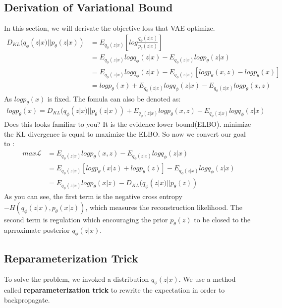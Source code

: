 \documentclass{article}
\begin{document}
\subsection{Derivation of Variational Bound}
In this section, we will derivate the objective loss that VAE optimize.
\begin{align*}
D_{KL}(q_{\phi}(z|x)||p_{\theta}(z|x)) &= E_{q_{\phi}(z|x)} \left[ log \frac{q_{\phi}(z|x)}{p_{\theta}(z|x)} \right] \\
&= E_{q_{\phi}(z|x)}logq_{\phi}(z|x) -E_{q_{\phi}(z|x)} log p_{\theta}(z|x) \\
&= E_{q_{\phi}(z|x)}logq_{\phi}(z|x) -E_{q_{\phi}(z|x)}[log p_{\theta}(x,z)-log p_{\theta}(x)] \\
&= log p_{\theta}(x) + E_{q_{\phi}(z|x)}logq_{\phi}(z|x)- E_{q_{\phi}(z|x)}log p_{\theta}(x,z)
\end{align*}
As $log p_{\theta}(x)$ is fixed. The fomula can also be denoted as:
\begin{align*}
log p_{\theta}(x)=D_{KL}(q_{\phi}(z|x)||p_{\theta}(z|x)) + E_{q_{\phi}(z|x)}log p_{\theta}(x,z) -E_{q_{\phi}(z|x)}logq_{\phi}(z|x)
\end{align*}
Does this looks familiar to you? It is the evidence lower bound(ELBO). minimize the KL divergence is equal to maximize the ELBO. So now we convert our goal to :
\begin{align*}
max \mathcal{L} &= E_{q_{\phi}(z|x)}log p_{\theta}(x,z) -E_{q_{\phi}(z|x)}logq_{\phi}(z|x) \\
&= E_{q_{\phi}(z|x)}[logp_{\theta}(x|z)+logp_{\theta}(z)]-E_{q_{\phi}(z|x)}logq_{\phi}(z|x) \\
&= E_{q_{\phi}(z|x)}logp_{\theta}(x|z)-D_{KL}(q_{\phi}(z|x)||p_{\theta}(z))
\end{align*}
As you can see, the first term is the negative cross entropy $-H(q_{\phi}(z|x),p_{\theta}(x|z))$, which measures the reconstruction likelihood. The second term is regulation which encouraging the prior $p_{\theta}(z)$ to be closed to the aprroximate posterior $q_{\phi}(z|x)$.
\subsection{Reparameterization Trick}
To solve the problem, we invoked a distribution $q_{\phi}(z|x)$. We use a method called \textbf{reparameterization trick} to rewrite the expectation in order to backpropagate.
\end{document}
